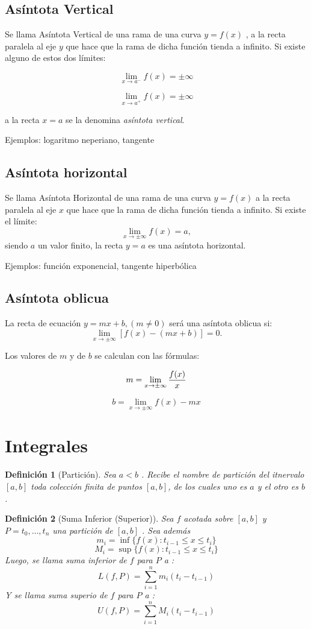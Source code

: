 \documentclass[12pt,a4paper]{extarticle}
\newtheorem{mydef}{Definici\'on}[section]
\begin{document}
\subsection{As\'intota Vertical}
Se llama As\'intota Vertical de una rama de una curva \( y = f(x) \) , a la recta paralela al eje \( y \)  que hace que la rama de dicha funci\'on tienda a infinito. Si existe alguno de estos dos l\'imites:

\[ \lim_{x \to a^-} f(x) = \pm\infty \]


\[ \lim_{x \to a^+} f(x) = \pm\infty \]

a la recta \( x = a \)  se la denomina \emph{as\'intota vertical}.

Ejemplos: logaritmo neperiano, tangente
\subsection{As\'intota horizontal}
Se llama As\'intota Horizontal de una rama de una curva \(  y = f(x) \)  a la recta paralela al eje \( x \)  que hace que la rama de dicha funci\'on tienda a infinito. Si existe el l\'imite:
\[  \lim_{x \to \pm\infty} f(x)= a , \]
siendo \( a \)  un valor finito, la recta \( y = a \)  es una as\'intota horizontal.

Ejemplos: funci\'on exponencial, tangente hiperb\'olica
\subsection{As\'intota oblicua}
La recta de ecuaci\'on \( y = mx + b ,  (m \neq 0) \)  ser\'a una as\'intota oblicua si:
\[ \lim_{x \to \pm\infty}[f(x)-(mx+b)] = 0. \]

Los valores de \( m \)  y de \( b \)  se calculan con las f\'ormulas:

\[ m = \lim_{x \to \pm\infty}{f(x) \over x} \]

\[ b = \lim_{x \to \pm\infty}{f(x)-mx} \]

\section{Integrales}


\begin{mydef}[Partici\'on]
Sea \( a < b \) . Recibe el nombre de \emph{partici\'on} del itnervalo
\( [a,b] \) toda colecci\'on finita de puntos \( [a,b] \), de los
cuales uno es \( a \) y el otro es \( b \) .
\end{mydef}

\begin{mydef}[Suma Inferior (Superior)]
Sea \( f \) acotada sobre \( [a,b] \) y \( P = {t_0, \dots, t_n} \)
una partici\'on de \( [a,b] \) . Sea adem\'as
\[ m_i= \inf\{f(x):t_{i-1} \leq x \leq t_i\} \]
\[ M_i= \sup\{f(x):t_{i-1} \leq x \leq t_i\} \]
Luego, se llama \emph{suma inferior} de \( f \)  para \( P \) a :
\[ L(f,P)= \sum_{i=1}^n m_i(t_i-t_{i-1}) \]
Y se llama \emph{suma superio} de \( f \)  para \( P \) a :
\[ U(f,P)= \sum_{i=1}^n M_i(t_i-t_{i-1}) \]
\end{mydef}
\end{document}
